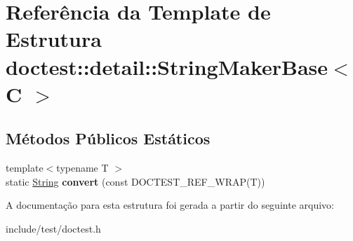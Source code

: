 \hypertarget{structdoctest_1_1detail_1_1StringMakerBase}{}\section{Referência da Template de Estrutura doctest\+:\+:detail\+:\+:String\+Maker\+Base$<$ C $>$}
\label{structdoctest_1_1detail_1_1StringMakerBase}
\subsection*{Métodos Públicos Estáticos}
\begin{DoxyCompactItemize}
\item 
\mbox{\label{structdoctest_1_1detail_1_1StringMakerBase_a67d29f2a5de9a522d8e8607c1a39db9b}} 
{\footnotesize template$<$typename T $>$ }\\static \hyperlink{classdoctest_1_1String}{String} {\bfseries convert} (const D\+O\+C\+T\+E\+S\+T\+\_\+\+R\+E\+F\+\_\+\+W\+R\+AP(T))
\end{DoxyCompactItemize}


A documentação para esta estrutura foi gerada a partir do seguinte arquivo\+:\begin{DoxyCompactItemize}
\item 
include/test/doctest.\+h\end{DoxyCompactItemize}
